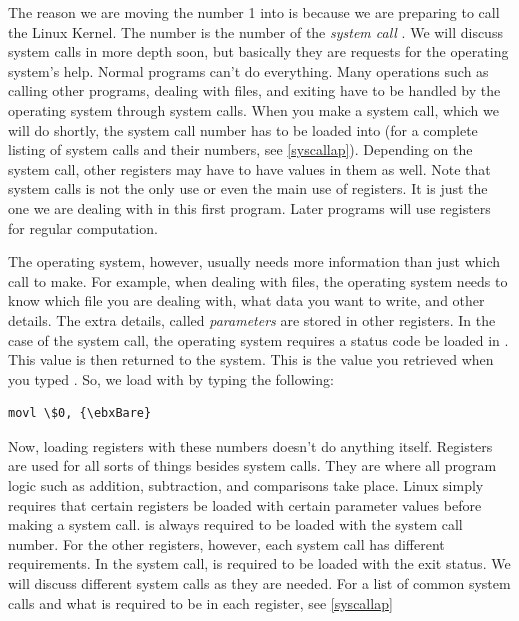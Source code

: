 The reason we are moving the number 1 into {\eaxReg} is because we are 
preparing to call the Linux Kernel. The
number  is the number of the 
\emph{system call}
.
We will discuss system calls in more depth soon, but basically they are 
requests for the operating system's help.  Normal programs can't do 
everything.  Many operations such as calling other programs, dealing with 
files, and exiting have to be handled
by the operating system through system calls.
When you make a system call, which we will do shortly, the system
call number has to be loaded into {\eaxRegIdx}
(for a complete listing of system calls and their numbers,
see \autoref{syscallap}).
Depending on the system call, other registers may have
to have values in them as well.  Note that system calls is not the only use or
even the main use of registers.  It is just the one we are dealing with in
this first program.  Later programs will use registers for regular 
computation.

The operating system, however, usually needs more information than just which
call to make.   For example, when dealing with files, the operating system 
needs to know which file you are dealing with, what data you want to write, 
and other
details.  The extra details, called \emph{parameters}
are stored in other registers.  In the case of the  system call,
the operating system requires a status code be loaded in {\ebxRegIdx}.  This 
value is then returned to the system.  This is the value you retrieved 
when you typed .  So, we load {\ebxReg} with 
 by typing the following:

\begin{simpletyping}
\begin{lstlisting}
movl \$0, {\ebxBare}
\end{lstlisting}
\end{simpletyping}

Now, loading 
registers with these 
numbers doesn't do anything itself.
Registers are used for all sorts of things besides system calls.  They
are where all program logic such as addition, subtraction, and comparisons
take place.  Linux simply requires that certain registers be loaded with
certain parameter values before making a system call.  {\eaxRegIdx} is 
always required to be loaded with the system call number.  
For the other registers, however, each system call has different requirements.
In the 
system call, {\ebxRegIdx} is required to be loaded with the exit status.
We will discuss different system calls as they are needed.  For a list of
common system calls and what is required to be in each register, see \autoref{syscallap}

